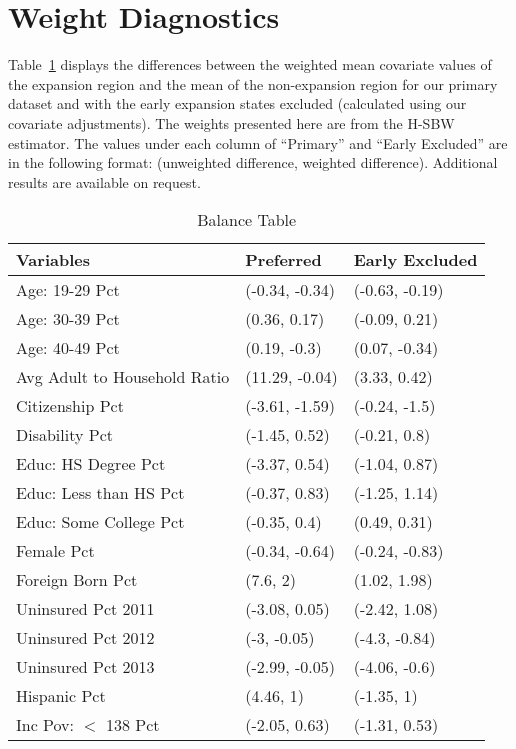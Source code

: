 \section{Weight Diagnostics}
\label{ssec:balancetables}

Table~\ref{tab:baltab1} displays the differences between the weighted mean covariate values of the expansion region and the mean of the non-expansion region for our primary dataset and with the early expansion states excluded (calculated using our covariate adjustments). The weights presented here are from the H-SBW estimator. The values under each column of ``Primary'' and ``Early Excluded'' are in the following format: (unweighted difference, weighted difference). Additional results are available on request.

\begin{table}[ht]
\centering
    \caption{Balance Table}
    \label{tab:baltab1}
\begin{tabular}{lll}
  \hline
Variables & Preferred & Early Excluded \\ 
  \hline
Age: 19-29 Pct & (-0.34, -0.34) & (-0.63, -0.19) \\ 
  Age: 30-39 Pct & (0.36, 0.17) & (-0.09, 0.21) \\ 
  Age: 40-49 Pct & (0.19, -0.3) & (0.07, -0.34) \\ 
  Avg Adult to Household Ratio & (11.29, -0.04) & (3.33, 0.42) \\ 
  Citizenship Pct & (-3.61, -1.59) & (-0.24, -1.5) \\ 
  Disability Pct & (-1.45, 0.52) & (-0.21, 0.8) \\ 
  Educ: HS Degree Pct & (-3.37, 0.54) & (-1.04, 0.87) \\ 
  Educ: Less than HS Pct & (-0.37, 0.83) & (-1.25, 1.14) \\ 
  Educ: Some College Pct & (-0.35, 0.4) & (0.49, 0.31) \\ 
  Female Pct & (-0.34, -0.64) & (-0.24, -0.83) \\ 
  Foreign Born Pct & (7.6, 2) & (1.02, 1.98) \\ 
  Uninsured Pct 2011 & (-3.08, 0.05) & (-2.42, 1.08) \\ 
  Uninsured Pct 2012 & (-3, -0.05) & (-4.3, -0.84) \\ 
  Uninsured Pct 2013 & (-2.99, -0.05) & (-4.06, -0.6) \\ 
  Hispanic Pct & (4.46, 1) & (-1.35, 1) \\ 
  Inc Pov: $<$ 138 Pct & (-2.05, 0.63) & (-1.31, 0.53) \\ 

\end{tabular}
\end{table}
